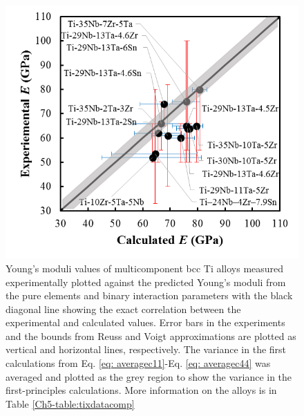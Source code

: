 \pagebreak
\begin{figure}[H]
	\centering
	\includegraphics{Chapter-5/Figures/edatabase.png}
	\caption{Young's moduli values of multicomponent bcc Ti alloys measured experimentally plotted against the predicted Young's moduli from the pure elements and binary interaction parameters with the black diagonal line showing the exact correlation between the experimental and calculated values. Error bars in the experiments and the bounds from Reuss and Voigt approximations are plotted as vertical and horizontal lines, respectively. The variance in the first calculations from Eq. \ref{eq: averagec11}-Eq. \ref{eq: averagec44} was averaged and plotted as the grey region to show the variance in the first-principles calculations. More information on the alloys is in Table \ref{Ch5-table:tixdatacomp} \cite{Tane2010a,Geetha2009,Mohammed2014}}
	\label{Ch5-figure:tixdatabase}
\end{figure}